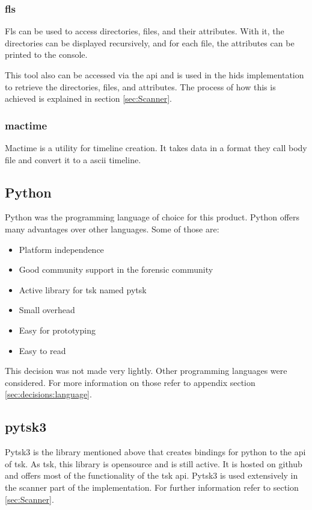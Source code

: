 \subsubsection{fls}
\label{sec:fls}

Fls can be used to access directories, files, and their attributes. With it, the directories can be displayed recursively, and for each file, the attributes can be printed to the console. \cite{tsk:fls} 

This tool also can be accessed via the \gls{api} and is used in the \gls{hids} implementation to retrieve the directories, files, and attributes. The process of how this is achieved is explained in section \ref{sec:Scanner}.

\subsubsection{mactime}
\label{sec:mactime}

Mactime is a utility for timeline creation. It takes data in a format they call body file and convert it to a ascii timeline. \cite{tsk:mactime, tsk:bodyfile}

\subsection{Python}
\label{sec:python}

Python was the programming language of choice for this product. Python offers many advantages over other languages. Some of those are:

\begin{itemize}
    \item Platform independence
    \item Good community support in the forensic community
    \item Active library for \gls{tsk} named \gls{pytsk}
    \item Small overhead
    \item Easy for prototyping
    \item Easy to read
\end{itemize}

This decision was not made very lightly. Other programming languages were considered. For more information on those refer to appendix section \ref{sec:decisions:language}.

\subsection{pytsk3}
\label{sec:pytsk3}

Pytsk3 is the library mentioned above that creates bindings for python to the \gls{api} of \gls{tsk}. As \gls{tsk}, this library is \gls{opensource} and is still active. It is hosted on \gls{github} and offers most of the functionality of the \gls{tsk} \gls{api}. Pytsk3 is used extensively in the scanner part of the implementation. For further information refer to section \ref{sec:Scanner}.

